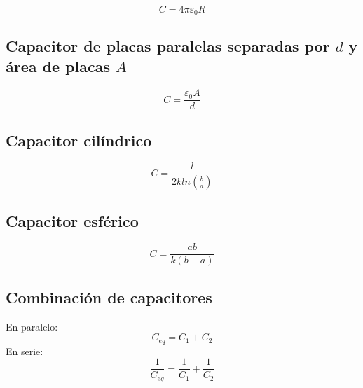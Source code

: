 \documentclass{report}
\begin{document}
      \begin{equation*}
        C=4\pi\varepsilon_0R
      \end{equation*}

    \subsection*{Capacitor de placas paralelas separadas por $d$ y área de placas $A$}

      \begin{equation*}
        C=\frac{\varepsilon_0A}{d}
      \end{equation*}

    \subsection*{Capacitor cilíndrico}

      \begin{equation*}
        C=\frac{l}{2kln(\frac{b}{a})}
      \end{equation*}

    \subsection*{Capacitor esférico}

      \begin{equation*}
        C=\frac{ab}{k(b-a)}
      \end{equation*}

    \subsection*{Combinación de capacitores}
      
      En paralelo:\\
      \begin{equation*}
        C_{eq}=C_1+C_2
      \end{equation*}
      \indent En serie:\\
      \begin{equation*}
        \frac{1}{C_{eq}}=\frac{1}{C_1}+\frac{1}{C_2}
      \end{equation*}
\end{document}
